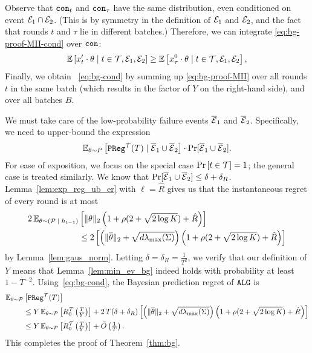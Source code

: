 Observe that $\mathtt{con}_t$ and $\mathtt{con}_\tau$ have the same distribution, even conditioned on event $\mathcal{E}_1 \cap\mathcal{E}_2$. (This is by symmetry in the definition of $\mathcal{E}_1$ and $\mathcal{E}_2$, and the fact that rounds $t$ and $\tau$ lie in different batches.)
Therefore, we can integrate \eqref{eq:bg-proof-MII-cond} over $\mathtt{con}$:
\begin{align}\label{eq:bg-proof-MII}
 \mathbb{E}\left[ x'_t \cdot \theta \;|\; t\in\mathcal{T},\mathcal{E}_1,\mathcal{E}_2  \right]
    \geq \mathbb{E}\left[ x^0_\tau \cdot \theta  \;|\; t\in\mathcal{T},\mathcal{E}_1,\mathcal{E}_2\right],
 \end{align}
Finally, we obtain ~\eqref{eq:bg-cond} by summing up \eqref{eq:bg-proof-MII} over all rounds $t$ in the same batch (which results in the factor of $Y$ on the right-hand side), and over all batches $B$.


We must take care of the low-probability failure events $\overline{\mathcal{E}}_1$ and
$\overline{\mathcal{E}}_2$.
Specifically, we need to upper-bound the expression
  \[
    \operatorname{\mathbb{E}}_{\theta \sim P} \left[\mathtt{PReg}^{\mathcal{T}}(T) \;|\; \overline{\mathcal{E}}_1 \cup \overline{\mathcal{E}}_2\right] \cdot \Pr[\overline{\mathcal{E}}_1 \cup \overline{\mathcal{E}}_2].
  \]
  For ease of exposition, we focus on the special case  $\Pr\left[t \in \mathcal{T}\right] = 1$; the general case is treated similarly. We know that $\Pr[\overline{\mathcal{E}}_1 \cup \overline{\mathcal{E}}_2] \le \delta +
  \delta_R$.
  Lemma~\ref{lem:exp_reg_ub_er} with $\ell = \hat R$
  gives us that the instantaneous regret of every round is at most
  \begin{align*}
    2\operatorname{\mathbb{E}}_{\theta \sim (\mathcal{P} \;|\; h_{t-1})} & \left[\|\theta\|_2\left(1 + \rho(2 +
      \sqrt{2 \log K}) + \hat R\right)\right] \\
    &\le 2\left[\left(\|\overline \theta\|_2 + \sqrt{d\lambda_{\max}(\Sigma)}\right)\left(1 + \rho(2 +
      \sqrt{2 \log K}) + \hat R\right)\right]
  \end{align*}
  by Lemma~\ref{lem:gaus_norm}. Letting $\delta = \delta_R = \frac{1}{T^2}$, we
  verify that our definition of $Y$ means that Lemma~\ref{lem:min_ev_bg} indeed
  holds with probability at least $1-T^{-2}$.
  Using~\eqref{eq:bg-cond}, the Bayesian prediction regret of $\mathtt{ALG}$ is
  \begin{align*}
    \operatorname{\mathbb{E}}_{\theta \sim \mathcal{P}} &\left[\mathtt{PReg}^{\mathcal{T}}(T)\right] \\
    &\le Y \operatorname{\mathbb{E}}_{\theta \sim \mathcal{P}} \left[R_0^{\mathcal{T}}\left(\tfrac{T}{Y}\right)\right] 
    + 2\,T(\delta + \delta_R)\left[\left(\|\overline \theta\|_2 + \sqrt{d\lambda_{\max}(\Sigma)}\right)\left(1
      + \rho(2 + \sqrt{2 \log K}) + \hat R\right)\right] \\
    &\le Y \operatorname{\mathbb{E}}_{\theta \sim \mathcal{P}} \left[R_0^{\mathcal{T}}\left(\tfrac{T}{Y}\right)\right] + \tilde
    O\left(\tfrac{1}{T}\right).
  \end{align*}
This completes the proof of Theorem~\ref{thm:bg}.

